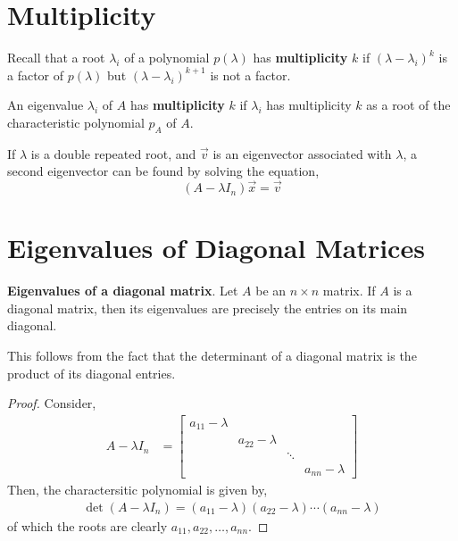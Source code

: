 \documentclass[letterpaper,12pt]{article}
\begin{document}
\section*{Multiplicity}
Recall that a root $\lambda_i$ of a polynomial $p(\lambda)$ has \textbf{multiplicity} $k$ if $(\lambda - \lambda_i)^k$ is a factor of $p(\lambda)$ but $(\lambda - \lambda_i)^{k+1}$ is not a factor. 

\begin{definition}
An eigenvalue $\lambda_i$ of $A$ has \textbf{multiplicity} $k$ if $\lambda_i$ has multiplicity $k$ as a root of the characteristic polynomial $p_A$ of $A$.
\end{definition}

If $\lambda$ is a double repeated root, and $\vec{v}$ is an eigenvector associated with $\lambda$, a second eigenvector can be found by solving the equation,
\begin{equation*}
    (A - \lambda I_n) \vec{x} = \vec{v}
\end{equation*}


\section*{Eigenvalues of Diagonal Matrices}
\begin{theorem}
\textbf{Eigenvalues of a diagonal matrix}. Let $A$ be an $n \times n$ matrix. If $A$ is a diagonal matrix, then its eigenvalues are precisely the entries on its main diagonal.
\end{theorem}

This follows from the fact that the determinant of a diagonal matrix is the product of its diagonal entries.

\begin{proof}
Consider,
\begin{align*}
    A - \lambda I_n & = \begin{bmatrix} a_{11} - \lambda & & & \\
    & a_{22} - \lambda & & \\
    & & \ddots & \\
    & & & a_{nn} - \lambda \end{bmatrix}
\end{align*}
Then, the charactersitic polynomial is given by,
\begin{align*}
    \det(A - \lambda I_n) = (a_{11} - \lambda)(a_{22} - \lambda) \cdots (a_{nn} - \lambda)
\end{align*}
of which the roots are clearly $a_{11}, a_{22}, \dots, a_{nn}$.
\end{proof}
\end{document}
